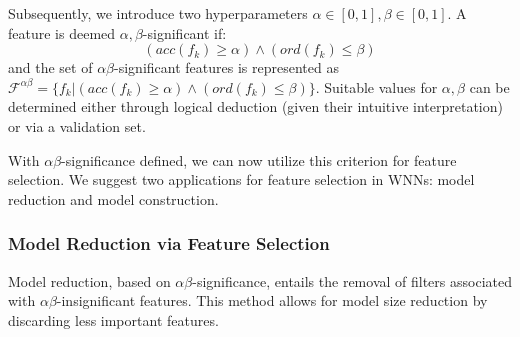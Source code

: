 \documentclass{article}[12pt]
\begin{document}
Subsequently, we introduce two hyperparameters $\alpha \in [0,1], \beta \in [0,1]$.
A feature is deemed $\alpha,\beta$-significant if:
\begin{equation}
    (acc(f_k) \ge \alpha) \wedge (ord(f_k) \le \beta)\label{eq:equation}
\end{equation}
and the set of $\alpha\beta$-significant features is represented as $\mathcal{F}^{\alpha\beta} = \{f_k| (acc(f_k) \ge \alpha) \wedge (ord(f_k) \le \beta)\}$.
Suitable values for $\alpha, \beta$ can be determined either through logical deduction (given their intuitive interpretation) or via a validation set.

With $\alpha\beta$-significance defined, we can now utilize this criterion for feature selection.
We suggest two applications for feature selection in WNNs: model reduction and model construction.

\subsubsection*{Model Reduction via Feature Selection}
Model reduction, based on $\alpha\beta$-significance, entails the removal of filters associated with $\alpha\beta$-insignificant features.
This method allows for model size reduction by discarding less important features.
\end{document}
